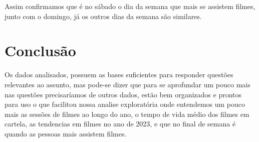 \documentclass[12pt, a4paper]{article}
\begin{document}
Assim confirmamos que é no sábado o dia da semana que mais se assistem filmes, junto com o domingo, já os outros dias da semana são similares.


\section{Conclusão}
Os dados analisados, possuem as bases suficientes para responder questões relevantes ao assunto, mas pode-se dizer que para se aprofundar um pouco mais nas questões precisaríamos de outros dados, estão bem organizados e prontos para uso o que facilitou nossa analise exploratória onde entendemos um pouco mais as sessões de filmes ao longo do ano, o tempo de vida médio dos filmes em cartela, as tendencias em filmes no ano de 2023, e que no final de semana é quando as pessoas mais assistem filmes.
\end{document}
